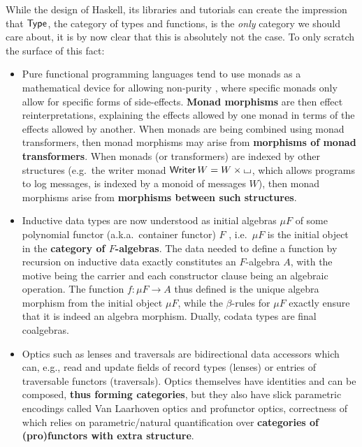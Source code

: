 \documentclass[twoLevelNum]{higherStructures} %
\begin{document}
While the design of Haskell, its libraries and tutorials can create the impression that ${\mathsf{Type}}$, the category of types and functions, is the \emph{only} category we should care about, it is by now clear that this is absolutely not the case.
To only scratch the surface of this fact:
\begin{itemize}
	\item Pure functional programming languages tend to use monads as a mathematical device for allowing non-purity \cite{moggi-monads}, where specific monads only allow for specific forms of side-effects.
	\textbf{Monad morphisms} are then effect reinterpretations, explaining the effects allowed by one monad in terms of the effects allowed by another.
	When monads are being combined using monad transformers, then monad morphisms may arise from \textbf{morphisms of monad transformers}.
	When monads (or transformers) are indexed by other structures (e.g.\ the writer monad ${\mathsf{Writer}}\,W = W \times {\llcorner\hspace{-.4ex}\lrcorner}$, which allows programs to log messages, is indexed by a monoid of messages $W$), then monad morphisms arise from \textbf{morphisms between such structures}.
	
	\item Inductive data types are now understood as initial algebras $\mu F$ of some polynomial functor (a.k.a.\ container functor) $F$ \cite{containers}, i.e.\ $\mu F$ is the initial object in the \textbf{category of $F$-algebras}.
	The data needed to define a function by recursion on inductive data exactly constitutes an $F$-algebra $A$, with the motive being the carrier and each constructor clause being an algebraic operation.
	The function $f : \mu F \to A$ thus defined is the unique algebra morphism from the initial object $\mu F$, while the $\beta$-rules for $\mu F$ exactly ensure that it is indeed an algebra morphism.
	Dually, codata types are final coalgebras.
	
	\item Optics such as lenses and traversals are bidirectional data accessors which can, e.g., read and update fields of record types (lenses) or entries of traversable functors (traversals).
	Optics themselves have identities and can be composed, \textbf{thus forming categories}, but they also have slick parametric encodings called Van Laarhoven optics and profunctor optics, correctness of which relies on parametric/natural quantification over \textbf{categories of (pro)functors with extra structure}.
\end{itemize}
\end{document}
